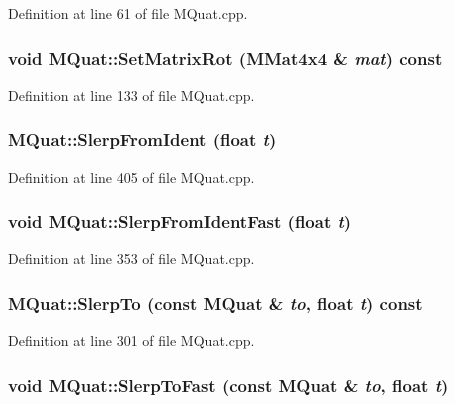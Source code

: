Definition at line 61 of file MQuat.cpp.\hypertarget{class_m_quat_09045cf01b60cbd8894da32f1fa04eed}{
\subsubsection[{SetMatrixRot}]{\setlength{\rightskip}{0pt plus 5cm}void MQuat::SetMatrixRot ({\bf MMat4x4} \& {\em mat}) const}}
\label{class_m_quat_09045cf01b60cbd8894da32f1fa04eed}




Definition at line 133 of file MQuat.cpp.\hypertarget{class_m_quat_14142a1d596dd9adbd9fba59b94123d4}{
\subsubsection[{SlerpFromIdent}]{ MQuat::SlerpFromIdent (float {\em t})}}
\label{class_m_quat_14142a1d596dd9adbd9fba59b94123d4}




Definition at line 405 of file MQuat.cpp.\hypertarget{class_m_quat_11cd2854533b239018aba53fa458cad2}{
\subsubsection[{SlerpFromIdentFast}]{\setlength{\rightskip}{0pt plus 5cm}void MQuat::SlerpFromIdentFast (float {\em t})}}
\label{class_m_quat_11cd2854533b239018aba53fa458cad2}




Definition at line 353 of file MQuat.cpp.\hypertarget{class_m_quat_e8ffbbff43cc352a258cf65a0f21e6da}{
\subsubsection[{SlerpTo}]{ MQuat::SlerpTo (const {\bf MQuat} \& {\em to}, \/  float {\em t}) const}}
\label{class_m_quat_e8ffbbff43cc352a258cf65a0f21e6da}




Definition at line 301 of file MQuat.cpp.\hypertarget{class_m_quat_34b3340801674c4f167e4301fd1e9d5a}{
\subsubsection[{SlerpToFast}]{\setlength{\rightskip}{0pt plus 5cm}void MQuat::SlerpToFast (const {\bf MQuat} \& {\em to}, \/  float {\em t})}}
\label{class_m_quat_34b3340801674c4f167e4301fd1e9d5a}




